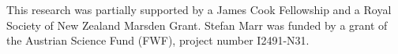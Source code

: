 
This research was partially supported by a James Cook Fellowship and a Royal Society of New Zealand Marsden Grant. Stefan Marr was funded by a grant of the Austrian Science Fund (FWF), project number I2491-N31.